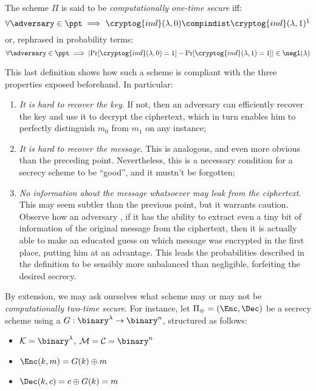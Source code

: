 \begin{definition}
    The scheme $\Pi$ is said to be \emph{computationally one-time secure} iff:
    \[
        \forall \adversary \in \ppt \implies \cryptog{ind}(\lambda, 0) \compindist \cryptog{ind}(\lambda, 1)\footnotemark
    \]  
    or, rephrased in probability terms:
    \[
        \forall \adversary \in \ppt \implies \lvert\Pr[\cryptog{ind}(\lambda, 0) = 1] - \Pr[\cryptog{ind}(\lambda, 1) = 1]\rvert \in \negl(\lambda)
    \]
\end{definition}

This last definition shows how such a scheme is compliant with the three properties exposed beforehand. In particular:


\begin{enumerate}
    \item \emph{It is hard to recover the key}. If not, then an adversary \adversary can efficiently recover the key and use it to decrypt the ciphertext, which in turn enables him to perfectly distinguish $m_{0}$ from $m_{1}$ on any instance;
    \item \emph{It is hard to recover the message}. This is analogous, and even more obvious than the preceding point. Nevertheless, this is a necessary condition for a secrecy scheme to be ``good'', and it mustn't be forgotten;
    \item \emph{No information about the message whatsoever may leak from the ciphertext}. This may seem subtler than the previous point, but it warrants caution. Observe how an adversary \adversary{}, if it has the ability to extract even a tiny bit of information of the original message from the ciphertext, then it is actually able to make an educated guess on which message was encrypted in the first place, putting him at an advantage. This leads the probabilities described in the definition to be sensibly more unbalanced than negligible, forfeiting the desired secrecy.
\end{enumerate}

By extension, we may ask ourselves what scheme may or may not be \emph{computationally two-time secure}. For instance, let $\Pi_{\xor} = (\Enc, \Dec)$ be a secrecy scheme using a \prg{} $G : \binary^\lambda \to \binary^n$, structured as follows:

\begin{itemize}
    \item $\K = \binary^\lambda$, $\M = \C= \binary^n$
    \item $\Enc(k, m) = G(k) \xor m$
    \item $\Dec(k, c) = c \xor G(k) = m$
\end{itemize}

